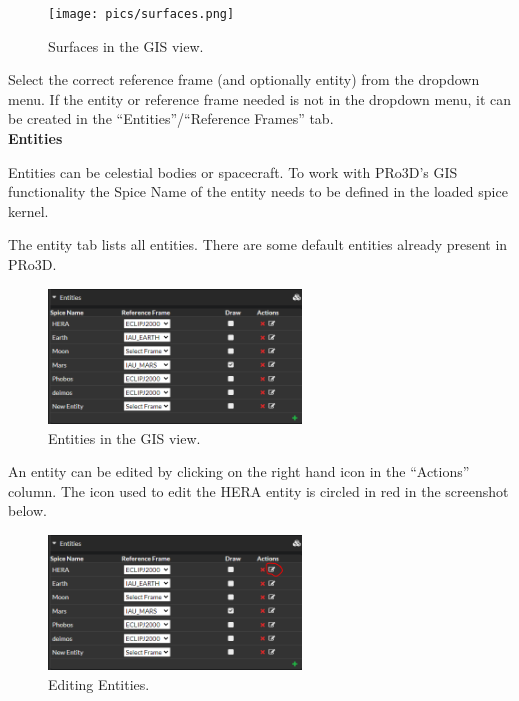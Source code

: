 \begin{figure}[h!]
	\centering
\texttt{[image: pics/surfaces.png]}
	\caption{Surfaces in the GIS view.}
\end{figure}


Select the correct reference frame (and optionally entity) from the
dropdown menu. If the entity or reference frame needed is not in the
dropdown menu, it can be created in the ``Entities''/``Reference
Frames'' tab.
\\

\hypertarget{entities}{%
	\textbf{Entities}\label{entities}}

Entities can be celestial bodies or spacecraft. To work with PRo3D's GIS
functionality the Spice Name of the entity needs to be defined in the
loaded spice kernel.

The entity tab lists all entities. There are some default entities
already present in PRo3D.

\begin{figure}[h!]
	\centering
	\includegraphics[width=0.6\textwidth]{pics/entities.png}
	\caption{Entities in the GIS view.}
\end{figure}



An entity can be edited by clicking on the right hand icon in the
``Actions'' column. The icon used to edit the HERA entity is circled in
red in the screenshot below.

\begin{figure}[h!]
	\centering
	\includegraphics[width=0.6\textwidth]{pics/editEntities.png}
	\caption{Editing Entities.}
\end{figure}


